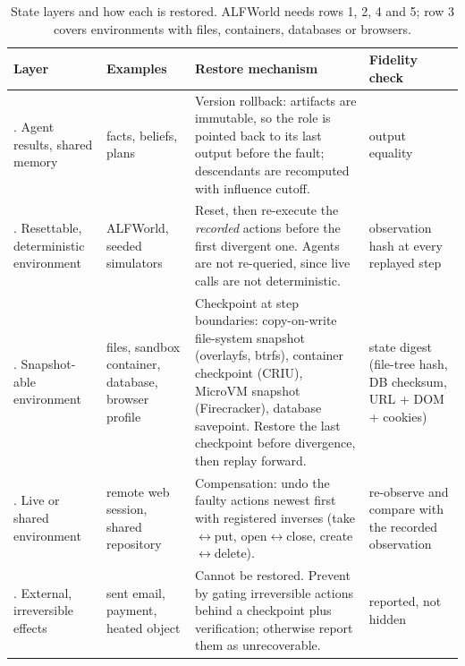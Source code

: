 \documentclass[10pt]{article}
\begin{document}
\begin{table}[h]
\centering\small
\caption{State layers and how each is restored. ALFWorld needs rows 1, 2, 4 and 5; row 3
covers environments with files, containers, databases or browsers.}
\label{tab:restore}
\begin{tabularx}{\linewidth}{@{}>{\raggedright\arraybackslash}p{2.3cm} >{\raggedright\arraybackslash}p{2.5cm} X >{\raggedright\arraybackslash}p{2.6cm}@{}}
\toprule
Layer & Examples & Restore mechanism & Fidelity check \\
\midrule
1. Agent results, shared memory & facts, beliefs, plans & Version rollback: artifacts are immutable, so the role is pointed back to its last output before the fault; descendants are recomputed with influence cutoff. & output equality \\
2. Resettable, deterministic environment & ALFWorld, seeded simulators & Reset, then re-execute the \emph{recorded} actions before the first divergent one. Agents are not re-queried, since live calls are not deterministic. & observation hash at every replayed step \\
3. Snapshot-able environment & files, sandbox container, database, browser profile & Checkpoint at step boundaries: copy-on-write file-system snapshot (overlayfs, btrfs), container checkpoint (CRIU), MicroVM snapshot (Firecracker), database savepoint. Restore the last checkpoint before divergence, then replay forward. & state digest (file-tree hash, DB checksum, URL + DOM + cookies) \\
4. Live or shared environment & remote web session, shared repository & Compensation: undo the faulty actions newest first with registered inverses (take$\leftrightarrow$put, open$\leftrightarrow$close, create$\leftrightarrow$delete). & re-observe and compare with the recorded observation \\
5. External, irreversible effects & sent email, payment, heated object & Cannot be restored. Prevent by gating irreversible actions behind a checkpoint plus verification; otherwise report them as unrecoverable. & reported, not hidden \\
\bottomrule
\end{tabularx}
\end{table}
\end{document}
